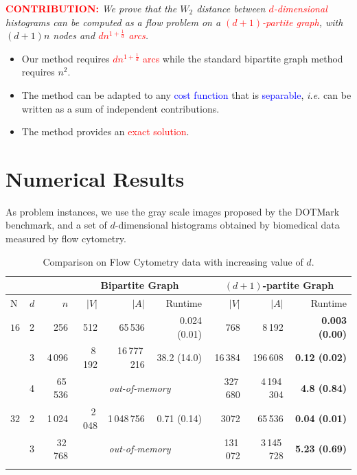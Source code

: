 \documentclass[al, 27pt, plainboxedsections, landscape]{sciposter}
\newcommand{\tb}[1]{\textcolor{blue}{#1}}
\newcommand{\tre}[1]{\textcolor{red}{#1}}
\begin{document}
\begin{multicols}{3}
{\large \tre{{\bf CONTRIBUTION:}}
\textit{
We prove that 
 the $W_2$ distance
between \tre{$d$-dimensional}  histograms can 
be computed as a flow problem 
on a  \tre{$(d+1)$-partite graph},  with   $(d+1)n$ nodes
  and  \tre{$dn^{1+\frac{1}{d}}$ arcs}. }}



\begin{itemize}
	\item Our method requires  \tre{$dn^{1+\frac{1}{d}}$ arcs} while the standard bipartite graph method requires $n^2$.
	\item The method can be adapted  to any \tb{cost function} that is \tb{separable}, \emph{i.e.} can be written as a sum of independent contributions.
	\item  The method provides an \tre{exact solution}. 
\end{itemize}

\section{Numerical Results}
As problem instances, we use the gray scale images proposed by
the DOTMark benchmark, and a set of $d$-dimensional histograms obtained by biomedical data
measured by flow cytometry.

\begin{table}
\caption{Comparison on Flow Cytometry data with increasing value of $d$.}
	\label{tab:3}
\centering
{\renewcommand{\arraystretch}{1.2}
\begin{tabular}{l@{\hskip 0.4in}l@{\hskip 0.4in}r@{\hskip 0.4in}rrr@{\hskip 0.4in}rr@{\hskip 0.4in}r}
     \multicolumn{3}{c}{} & \multicolumn{3}{c}{Bipartite Graph} & \multicolumn{3}{c}{$(d+1)$-partite Graph} \\
	 \hline
N & $d$ & $n$ & $|V|$ & $|A|$ & Runtime & $|V|$ & $|A|$ & Runtime  \\
\hline
$16$ & 2 & 256 & 512 & 65\,536 & 0.024 (0.01) & 768 & 8\,192 & {\bf 0.003 (0.00)} \\
& 3 & 4\,096 & 8\,192 & 16\,777\,216& 38.2 (14.0)   & 16\,384 & 196\,608& {\bf 0.12 (0.02)}  \\
& 4 & 65\,536 & \multicolumn{3}{c}{{\it out-of-memory}} & 327\,680 & 4\,194\,304& {\bf 4.8 (0.84)} \\
 \hline\noalign{\smallskip}
$32$ & 2 & 1\,024 & 2\,048 & 1\,048\,756 & 0.71 (0.14) & 3072 & 65\,536& {\bf 0.04 (0.01)} \\
& 3 & 32\,768& \multicolumn{3}{c}{{\it out-of-memory}}   & 131\,072 & 3\,145\,728& {\bf 5.23 (0.69)}  \\
 \hline\noalign{\smallskip}
 \end{tabular}}
\end{table}


\end{multicols}
\end{document}
